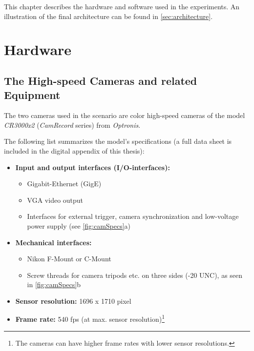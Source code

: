 \label{c:Components}	
This chapter describes the hardware and software used in the experiments. An illustration of the final architecture can be found in \autoref{sec:architecture}.
  
\section{Hardware} \label{sec:Hardware}
\subsection{The High-speed Cameras and related Equipment}
The two cameras used in the scenario are color high-speed cameras of the model \textit{CR3000x2} (\textit{CamRecord} series) from \textit{Optronis}. 

The following list summarizes the model's specifications (a full data sheet is included in the digital appendix of this thesis):
\begin{itemize}
\item \textbf{Input and output interfaces (I/O-interfaces):}
 \begin{itemize}
  \item Gigabit-Ethernet (GigE)
  \item VGA video output
  \item Interfaces for external trigger, camera synchronization and low-voltage power supply (see \autoref{fig:camSpecs}a)
 \end{itemize}
\item \textbf{Mechanical interfaces:}
 \begin{itemize}
  \item Nikon F-Mount or C-Mount
  \item Screw threads for camera tripods etc. on three sides (-20 UNC), as seen in \autoref{fig:camSpecs}b 
 \end{itemize}  
\item \textbf{Sensor resolution:} 1696 x 1710 pixel
\item \textbf{Frame rate:} 540 fps (at max. sensor resolution)\footnote{The cameras can have higher frame rates with lower sensor resolutions.}
\end{itemize}

